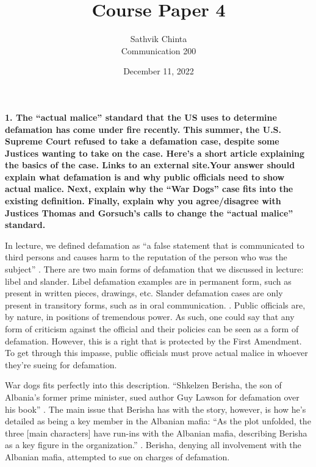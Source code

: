 \documentclass[a4paper]{article}
\title {
	Course Paper 4
}
\author {
	\normalsize Sathvik Chinta\\\normalsize
    \normalsize Communication 200\\\normalsize
}
\date {
	\color{black} December 11, 2022
}
\begin{document}
 \maketitle
    \section{}
        \textbf{1. The “actual malice” standard that the US uses to determine defamation has come under fire recently. This summer, the U.S. Supreme Court refused to take a defamation case, despite some Justices wanting to take on the case. Here’s a short article explaining the basics of the case.  Links to an external site.Your answer should explain what defamation is and why public officials need to show actual malice. Next, explain why the “War Dogs” case fits into the existing definition. Finally, explain why you agree/disagree with Justices Thomas and Gorsuch’s calls to change the “actual malice” standard.}

        In lecture, we defined defamation as “a false statement that is communicated to third persons and causes harm to the 
        reputation of the person who was the subject” \citep{lesson9}. There are two main forms of defamation that we discussed 
        in lecture: libel and slander. Libel defamation examples are in permanent form, such as present in written pieces, drawings, 
        etc. Slander defamation cases are only present in transitory forms, such as in oral communication. \citep{lesson9}. 
        Public officials are, by nature, in positions of tremendous power. As such, one could say that any form of criticism against 
        the official and their policies can be seen as a form of defamation. However, this is a right that is protected by the 
        First Amendment. To get through this impasse, public officials must prove actual malice in whoever they’re sueing for 
        defamation.
        
        War dogs fits perfectly into this description. “Shkelzen Berisha, the son of Albania's former prime minister, sued 
        author Guy Lawson for defamation over his book” \citep{williams_2021}. The main issue that Berisha has with the story, 
        however, is how he’s detailed as being a key member in the Albanian mafia: “As the plot unfolded, the three 
        [main characters] have run-ins with the Albanian mafia, describing Berisha as a key figure in the organization.” 
        \citep{williams_2021}. Berisha, denying all involvement with the Albanian mafia, attempted to sue on charges of defamation. 
        
\end{document}
